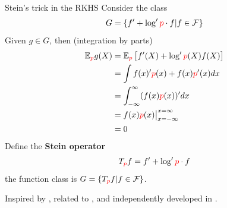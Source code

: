 \begin{frame}
\begin{columns}
\begin{column}{.33\linewidth}
\begin{block}{Stein's trick in the RKHS}
Consider the  class \large
$$G = \{ f'  +  \log' { \color{red} p} \cdot  f | f \in \mathcal{F} \}$$
\normalsize
Given $g\in G$, then (integration by parts)
\begin{align*}
\mathbb{E}_{\color{red} p} g(X) &=
\mathbb{E}_{\color{red} p} \left[ f'(X)  +  \log' {\color{red} p}(X) f(X) \right] \\
&= \int   f(x)' { \color{red} p}(x)   + f(x){\color{red} p}'(x) dx \\
&= \int_{-\infty}^{\infty} (f(x) {\color{red} p}(x) )'  dx \\
&= f(x) {\color{red} p}(x)  \big|_{x=-\infty}^{x=\infty} \\
&= 0
\end{align*}
Define the {\bf Stein operator}
\[
 T_{\color{red} p}f =  f'  +  \log' { \color{red} p} \cdot  f
\]
the function class is $G = \{ T_{\color{red} p}f | f \in \mathcal{F} \}$.

Inspired by \cite{gorham2015measuring}, related to \cite{OatGirCho15}, and independently developed in \cite{LiuLeeJor16}.
\end{block} %
\vspace{-0.75cm}



\end{column}
\end{columns}
\end{frame}
